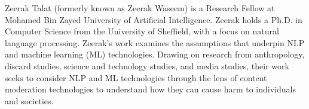 Zeerak Talat (formerly known as Zeerak Waseem) is a Research Fellow at Mohamed Bin Zayed University of Artificial Intelligence. Zeerak holds a Ph.D. in Computer Science from the University of Sheffield, with a focus on natural language processing.  Zeerak’s work examines the assumptions that underpin NLP and machine learning (ML) technologies. Drawing on research from anthropology, discard studies, science and technology studies, and media studies, their work seeks to consider NLP and ML technologies through the lens of content moderation technologies to understand how they can cause harm to individuals and societies.